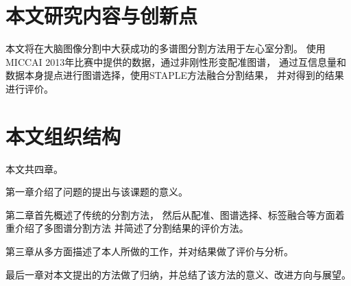 \section{本文研究内容与创新点}

本文将在大脑图像分割中大获成功的多谱图分割方法用于左心室分割。
使用MICCAI 2013年比赛中提供的数据，通过非刚性形变配准图谱，
通过互信息量和数据本身提点进行图谱选择，使用STAPLE方法融合分割结果，
并对得到的结果进行评价。

\section{本文组织结构}
本文共四章。

第一章介绍了问题的提出与该课题的意义。

第二章首先概述了传统的分割方法，
然后从配准、图谱选择、标签融合等方面着重介绍了多图谱分割方法
并简述了分割结果的评价方法。

第三章从多方面描述了本人所做的工作，并对结果做了评价与分析。

最后一章对本文提出的方法做了归纳，并总结了该方法的意义、改进方向与展望。

